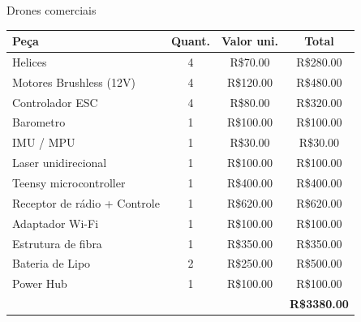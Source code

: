 \begin{frame}[t]{Drones comerciais}
  \transdissolve[duration=0.5]

  \centering
  \begin{tabular}{ l|c|c|c }
    \textbf{Peça}                & \textbf{Quant.} & \textbf{Valor uni.} &   \textbf{Total}    \\ \hline
    Helices                      &        4        &      R\$70.00       &      R\$280.00      \\
    Motores Brushless (12V)      &        4        &      R\$120.00      &      R\$480.00      \\
    Controlador ESC              &        4        &      R\$80.00       &      R\$320.00      \\
    Barometro                    &        1        &      R\$100.00      &      R\$100.00      \\
    IMU / MPU                    &        1        &      R\$30.00       &      R\$30.00       \\
    Laser unidirecional          &        1        &      R\$100.00      &      R\$100.00      \\
    Teensy microcontroller       &        1        &      R\$400.00      &      R\$400.00      \\
    Receptor de rádio + Controle &        1        &      R\$620.00      &      R\$620.00      \\
    Adaptador Wi-Fi              &        1        &      R\$100.00      &      R\$100.00      \\
    Estrutura de fibra           &        1        &      R\$350.00      &      R\$350.00      \\
    Bateria de Lipo              &        2        &      R\$250.00      &      R\$500.00      \\
    Power Hub                    &        1        &      R\$100.00      &      R\$100.00      \\ \hline
                                 &                 &                     & \textbf{R\$3380.00}
  \end{tabular}

\end{frame}